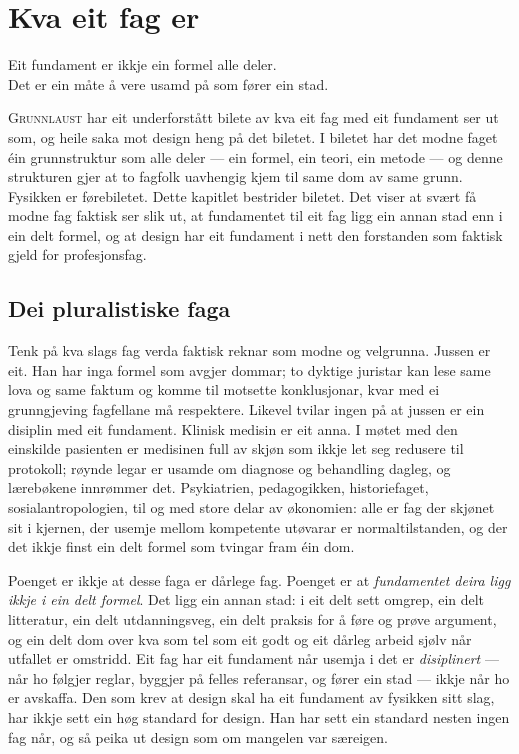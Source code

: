\chapter{Kva eit fag er}

\begin{motto}
Eit fundament er ikkje ein formel alle deler.\\ Det er ein måte å vere usamd på som fører ein stad.
\end{motto}

\textsc{Grunnlaust} har eit underforstått bilete av kva eit fag med eit fundament ser ut som, og heile saka mot design heng på det biletet. I biletet har det modne faget éin grunnstruktur som alle deler — ein formel, ein teori, ein metode — og denne strukturen gjer at to fagfolk uavhengig kjem til same dom av same grunn. Fysikken er førebiletet. Dette kapitlet bestrider biletet. Det viser at svært få modne fag faktisk ser slik ut, at fundamentet til eit fag ligg ein annan stad enn i ein delt formel, og at design har eit fundament i nett den forstanden som faktisk gjeld for profesjonsfag.

\section{Dei pluralistiske faga}

Tenk på kva slags fag verda faktisk reknar som modne og velgrunna. Jussen er eit. Han har inga formel som avgjer dommar; to dyktige juristar kan lese same lova og same faktum og komme til motsette konklusjonar, kvar med ei grunngjeving fagfellane må respektere. Likevel tvilar ingen på at jussen er ein disiplin med eit fundament. Klinisk medisin er eit anna. I møtet med den einskilde pasienten er medisinen full av skjøn som ikkje let seg redusere til protokoll; røynde legar er usamde om diagnose og behandling dagleg, og lærebøkene innrømmer det. Psykiatrien, pedagogikken, historiefaget, sosialantropologien, til og med store delar av økonomien: alle er fag der skjønet sit i kjernen, der usemje mellom kompetente utøvarar er normaltilstanden, og der det ikkje finst ein delt formel som tvingar fram éin dom.

Poenget er ikkje at desse faga er dårlege fag. Poenget er at \emph{fundamentet deira ligg ikkje i ein delt formel}. Det ligg ein annan stad: i eit delt sett omgrep, ein delt litteratur, ein delt utdanningsveg, ein delt praksis for å føre og prøve argument, og ein delt dom over kva som tel som eit godt og eit dårleg arbeid sjølv når utfallet er omstridd. Eit fag har eit fundament når usemja i det er \emph{disiplinert} — når ho følgjer reglar, byggjer på felles referansar, og fører ein stad — ikkje når ho er avskaffa. Den som krev at design skal ha eit fundament av fysikken sitt slag, har ikkje sett ein høg standard for design. Han har sett ein standard nesten ingen fag når, og så peika ut design som om mangelen var særeigen.

